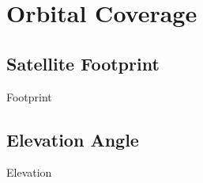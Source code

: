 \chapter{Orbital Coverage}


\section{Satellite Footprint}
{Footprint}

\section{Elevation Angle}
{Elevation}

